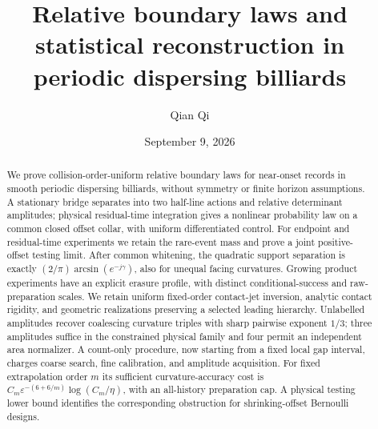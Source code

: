 
\title[Relative boundary laws and statistical reconstruction]{Relative boundary laws and statistical reconstruction
in periodic dispersing billiards}
\author{Qian Qi}
\date{September 9, 2026}

\begin{abstract}
We prove collision-order-uniform relative boundary laws for near-onset
records in smooth periodic dispersing billiards, without symmetry or
finite horizon assumptions. A stationary bridge separates into two
half-line actions and relative determinant amplitudes; physical
residual-time integration gives a nonlinear probability law on a
common closed offset collar, with uniform differentiated control.
For endpoint and residual-time experiments we retain the rare-event
mass and prove a joint positive-offset testing limit. After common
whitening, the quadratic support separation is exactly
$(2/\pi)\arcsin(e^{-j\gamma})$, also for unequal facing curvatures.
Growing product experiments have an explicit erasure profile, with
distinct conditional-success and raw-preparation scales. We retain
uniform fixed-order contact-jet inversion, analytic contact rigidity,
and geometric realizations preserving a selected leading hierarchy.
Unlabelled amplitudes recover coalescing curvature triples with sharp
pairwise exponent $1/3$; three amplitudes suffice in the constrained
physical family and four permit an independent area normalizer.
A count-only procedure, now starting from a fixed local gap interval,
charges coarse search, fine calibration, and amplitude acquisition.
For fixed extrapolation order $m$ its sufficient curvature-accuracy
cost is $C_m\varepsilon^{-(6+6/m)}\log(C_m/\eta)$, with an all-history
preparation cap. A physical testing lower bound identifies the
corresponding obstruction for shrinking-offset Bernoulli designs.
\end{abstract}
\maketitle

























